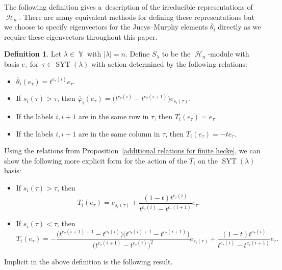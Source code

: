 \documentclass[10pt,a4paper]{amsart}
\numberwithin{equation}{section}
\theoremstyle{definition}
\newtheorem{Definition}[Theorem]{Definition}
\DeclareMathOperator{\Par}{\mathbb{Y}}
\DeclareMathOperator{\SYT}{\mathrm{SYT}}
\DeclareMathOperator{\sH}{\mathscr{H}}
\begin{document}
The following definition gives a~description of the irreducible representations of $\sH_n$. There are many equivalent methods for defining these representations but we choose to specify eigenvectors for the Jucys--Murphy elements $\overline{\theta}_i$ directly as we require these eigenvectors throughout this paper.

\begin{Definition}\label{irreps for finite hecke Definition}
 Let $\lambda \in \Par$ with $|\lambda| = n$. Define $S_{\lambda}$ to be the $\sH_n$-module with basis $e_{\tau}$ for~${\tau \in \SYT(\lambda)}$ with action determined by the following relations:
 \begin{itemize}
\itemsep=0pt
 \item $\overline{\theta}_i(e_{\tau}) = t^{c_{\tau}(i)}e_{\tau}$.
 \item If $s_i(\tau) > \tau$, then $\overline{\varphi}_i(e_{\tau}) = \bigl(t^{c_{\tau}(i)}-t^{c_{\tau}(i+1)}\bigr)e_{s_i(\tau)}$.
 \item If the labels $i,i+1$ are in the same row in $\tau$, then $T_i(e_{\tau}) = e_{\tau}$.
 \item If the labels $i,i+1$ are in the same column in $\tau$, then $T_i(e_{\tau}) = -te_{\tau}$.
 \end{itemize}
\end{Definition}

Using the relations from Proposition~\ref{additional relations for finite hecke}, we can show the following more explicit form for the action of the $T_i$ on the $\SYT(\lambda)$ basis:
\begin{itemize}
\itemsep=0pt
 \item If $s_i(\tau)> \tau$, then
 \[
 T_i(e_{\tau}) = e_{s_i(\tau)} + \frac{(1-t)t^{c_{\tau}(i)}}{t^{c_{\tau}(i)} - t^{c_{\tau}(i+1)}} e_{\tau}.
 \]

 \item If $s_i(\tau) < \tau$, then
 \[
 T_i(e_{\tau}) = -\frac{\bigl(t^{c_{\tau}(i+1)+1}-t^{c_{\tau}(i)}\bigr)\bigl(t^{c_{\tau}(i)+1}-t^{c_{\tau}(i+1)}\bigr)}{\bigl(t^{c_{\tau}(i+1)}-t^{c_{\tau}(i)}\bigr)^2} e_{s_i(\tau)} + \frac{(1-t)t^{c_{\tau}(i)}}{t^{c_{\tau}(i)} - t^{c_{\tau}(i+1)}} e_{\tau}.
 \]

\end{itemize}

Implicit in the above definition is the following result.
\end{document}
